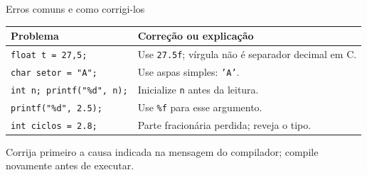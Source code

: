 \begin{frame}{Erros comuns e como corrigi-los}
\small
\begin{tabularx}{\textwidth}{XX}
\toprule
Problema & Correção ou explicação \\
\midrule
\texttt{float t = 27,5;} & Use \texttt{27.5f}; vírgula não é separador decimal em C. \\
\texttt{char setor = "A";} & Use aspas simples: \texttt{'A'}. \\
\texttt{int n; printf("\%d", n);} & Inicialize \texttt{n} antes da leitura. \\
\texttt{printf("\%d", 2.5);} & Use \texttt{\%f} para esse argumento. \\
\texttt{int ciclos = 2.8;} & Parte fracionária perdida; reveja o tipo. \\
\bottomrule
\end{tabularx}
\medskip
Corrija primeiro a causa indicada na mensagem do compilador; compile novamente antes de executar.
\end{frame}
